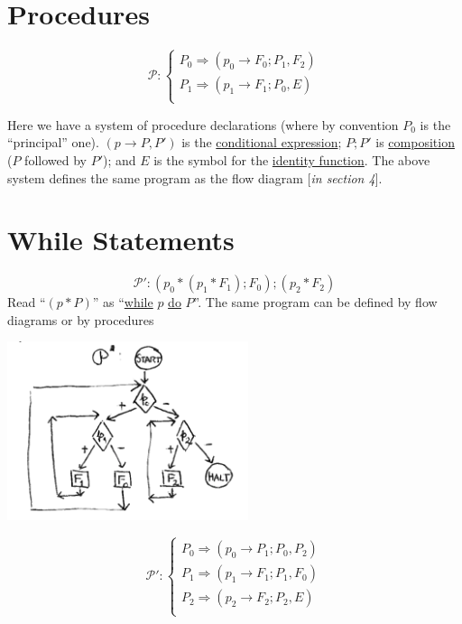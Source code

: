 \documentclass{article}
\newcommand{\scP}{\mathscr{P}}
\begin{document}
\section{Procedures}

\begin{equation*}
    \scP : \begin{cases}
        P_0 \Rightarrow (p_0 \to F_0; P_1, F_2)\\
        P_1 \Rightarrow (p_1 \to F_1; P_0, E)\\
    \end{cases}
\end{equation*}

Here we have a system of procedure declarations (where by convention $P_0$ is the ``principal'' one). $(p \to P, P')$ is the \underline{conditional expression}; $P;P'$ is \underline{composition} ($P$ followed by $P'$); and $E$ is the symbol for the \underline{identity function}. The above system defines the same program as the flow diagram [\textit{in section 4}]. 

\section{While Statements}
\begin{equation*}
    \scP': (p_0 * (p_1 * F_1); F_0); (p_2 * F_2)
\end{equation*}
Read ``$(p * P)$'' as ``\underline{while} $p$ \underline{do} $P$''. The same program can be defined by flow diagrams or by procedures

\begin{center}
    \includegraphics[width=200pt]{dg3.png}
\end{center}
\begin{equation*}
    \scP' : \begin{cases}
        P_0 \Rightarrow (p_0 \to P_1; P_0, P_2) \\
        P_1 \Rightarrow (p_1 \to F_1; P_1, F_0) \\
        P_2 \Rightarrow (p_2 \to F_2; P_2, E) \\
    \end{cases}
\end{equation*}
\end{document}
